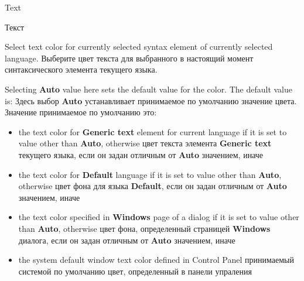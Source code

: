 \begin{popup}
\ifenglish
\caption{Text}
\else
\caption{Текст}
\fi
{}

\ifenglish
Select text color for currently selected syntax element of currently selected
language.
\else
Выберите цвет текста для выбранного в настоящий момент синтаксического элемента
текущего языка.
\fi

\ifenglish
Selecting {\bf Auto} value here sets the default value for the color. The default
value is:
\else
Здесь выбор {\bf Auto} устанавливает принимаемое по умолчанию значение цвета.
Значение принимаемое по умолчанию это:
\fi
\begin{itemize}
\item 
 \ifenglish
 the text color for {\bf Generic text} element for current language
 if it is set  to value other than {\bf Auto}, otherwise
 \else
 цвет текста элемента {\bf Generic text} текущего языка, если он задан
 отличным от {\bf Auto} значением, иначе
 \fi
\item 
 \ifenglish
 the text color for {\bf Default} language
 if it is set  to value other than {\bf Auto}, otherwise
 \else
  цвет фона для языка {\bf Default}, если он задан отличным от {\bf Auto}
 значением, иначе
 \fi
\item 
 \ifenglish
 the text color specified in {\bf Windows} page of a dialog
 if it is set  to value other than {\bf Auto}, otherwise
 \else
 цвет фона, определенный страницей {\bf Windows} диалога, если он
 задан отличным от {\bf Auto} значением, иначе
 \fi
\item 
 \ifenglish
 the system default window text color defined in Control Panel
 \else
 принимаемый системой по умолчанию цвет, определенный в панели упраления
 \fi
\end{itemize}
\end{popup}

